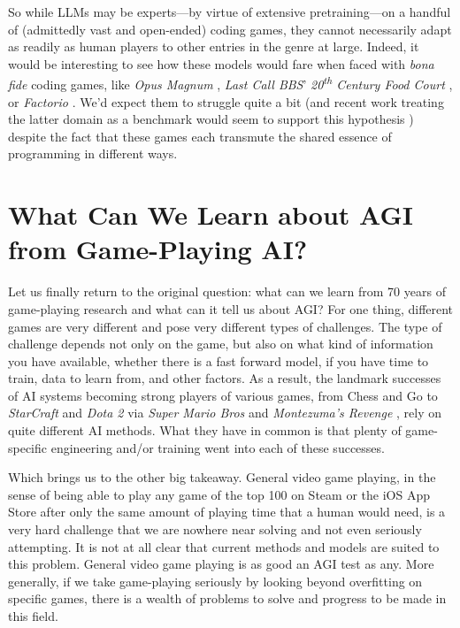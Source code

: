 \documentclass[runningheads]{llncs}
\begin{document}
So while LLMs may be experts---by virtue of extensive pretraining---on a handful of (admittedly vast and open-ended) coding games, they cannot necessarily adapt as readily as human players to other entries in the genre at large. Indeed, it would be interesting to see how these models would fare when faced with \textit{bona fide} coding games, like \textit{Opus Magnum} \cite{opus_magnum}, \textit{Last Call BBS}' \textit{20\textsuperscript{th} Century Food Court} \cite{last_call_bbs}, or \textit{Factorio} \cite{factorio}. We'd expect them to struggle quite a bit (and recent work treating the latter domain as a benchmark would seem to support this hypothesis \cite{hopkins2025factorio}) despite the fact that these games each transmute the shared essence of programming in different ways.

\section{What Can We Learn about AGI from Game-Playing AI?}

Let us finally return to the original question: what can we learn from 70 years of game-playing research and what can it tell us about AGI? For one thing, different games are very different and pose very different types of challenges. The type of challenge depends not only on the game, but also on what kind of information you have available, whether there is a fast forward model, if you have time to train, data to learn from, and other factors. As a result, the landmark successes of AI systems becoming strong players of various games, from Chess and Go to \textit{StarCraft} \cite{starcraft,vinyals2019grandmaster} and \textit{Dota 2} \cite{dota,berner2019dota} via \textit{Super Mario Bros} and \textit{Montezuma's Revenge} \cite{montezumas_revenge,ecoffet2021first}, rely on quite different AI methods. What they have in common is that plenty of game-specific engineering and/or training went into each of these successes.

Which brings us to the other big takeaway. General video game playing, in the sense of being able to play any game of the top 100 on Steam or the iOS App Store after only the same amount of playing time that a human would need, is a very hard challenge that we are nowhere near solving and not even seriously attempting. It is not at all clear that current methods and models are suited to this problem. General video game playing is as good an AGI test as any. More generally, if we take game-playing seriously by looking beyond overfitting on specific games, there is a wealth of problems to solve and progress to be made in this field.
\end{document}
